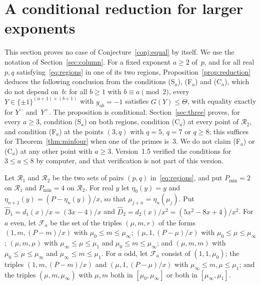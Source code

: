 \documentclass[11pt]{article}
\theoremstyle{remark}
\begin{document}
\section{A conditional reduction for larger exponents}\label{sec:minfour}
This section proves no case of Conjecture~\ref{conj:equal} by itself. We use the
notation of Section~\ref{sec:column}.
For a fixed exponent $a\ge2$ of~$p$, and for all real $p,q$
satisfying~\eqref{eq:regions} in one of its two regions,
Proposition~\ref{prop:reduction} deduces the following conclusion from the
conditions (S$_a$), (F$_a$) and (C$_a$), which do not depend on~$b$: for all
$b\ge1$ with $b\equiv a\pmod2$, every $Y\in\{\pm1\}^{(a+1)\times(b+1)}$ with
$y_{ab}=-1$ satisfies $G(Y)\le\Theta$, with equality exactly for $Y^-$ and~$Y^+$.
The proposition is conditional. Section~\ref{sec:three} proves, for every
$a\ge3$, condition (S$_a$) on both regions, condition (C$_a$) at every point of
$\mathcal R_2$, and condition (F$_a$) at the points $(3,q)$ with $q=5$, $q=7$ or
$q\ge8$; this suffices for Theorem~\ref{thm:minfour} when one of the primes is~$3$.
We do not claim (F$_a$) or (C$_a$) at any other point with $a\ge3$. Version~1.5
verified the conditions for $3\le a\le8$ by computer, and that verification is not
part of this version.

Let $\mathcal R_1$ and $\mathcal R_2$ be the two sets of pairs $(p,q)$
in~\eqref{eq:regions}, and put $P_{\min}=2$ on $\mathcal R_1$ and
$P_{\min}=4$ on $\mathcal R_2$. For real $y$ let $\eta_0(y)=y$ and
$\eta_{n+1}(y)=(P-\eta_n(y))/x$, so that $\mu_{j+n}=\eta_n(\mu_j)$. Put
$\hat D_1=d_1(x)/x=(3x-4)/x$ and $\hat D_2=d_2(x)/x^2=(5x^2-8x+4)/x^2$. For
$a$ even, let $\mathcal F_a$ be the set of the triples $(\mu,m,r)$ of the
forms $(1,m,(P-m)/x)$ with $\mu_0\le m\le\mu_\infty$; $(\mu,1,(P-\mu)/x)$ with
$\mu_0\le\mu\le\mu_\infty$; $(\mu,m,\mu)$ with $\mu_\infty\le\mu\le\mu_1$ and
$\mu_0\le m\le\mu_\infty$; and $(\mu,m,m)$ with $\mu_0\le\mu\le\mu_\infty$ and
$\mu_\infty\le m\le\mu_1$. For $a$ odd, let $\mathcal F_a$ consist of
$(1,1,\mu_0)$; the triples $(1,m,(P-m)/x)$ and $(\mu,1,(P-\mu)/x)$ with
$\mu_\infty\le m,\mu\le\mu_1$; and the triples $(\mu,m,\mu_\infty)$ with
$\mu,m$ both in $[\mu_0,\mu_\infty]$ or both in $[\mu_\infty,\mu_1]$.
\end{document}
